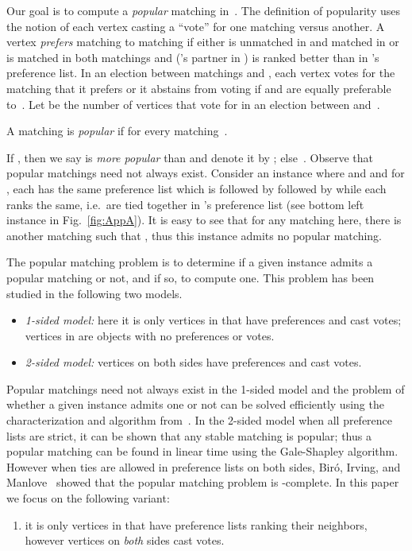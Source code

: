 \documentclass[11pt]{llncs}
\begin{document}
Our goal is to compute a {\em popular} matching in~. The definition of popularity uses the 
notion of each vertex casting a ``vote'' for one matching versus another. A vertex  
{\em prefers} matching  to matching  if either  is unmatched in  and matched in 
 or  is matched in both matchings and  ('s partner in ) is ranked better 
than  in 's preference list. In an election between matchings  and , each 
vertex  votes for the matching that it prefers or it abstains from voting if  and  
are equally preferable to~. Let  be the number of vertices that vote for  in 
an election between  and~.

\begin{definition}
A matching  is \emph{popular} if  for every matching~.
\end{definition}

If , then we say  is {\em more popular} than  and denote it by 
; else~. Observe that popular matchings need not always exist. 
Consider an instance where  and  and for , 
each  has the same preference list which is  followed by  followed by  
while each  ranks  the same, i.e.\  are tied together in 's 
preference list (see bottom left instance in Fig.~\ref{fig:AppA}). It is easy to see that for any matching  
here, there is another matching  such that , thus this instance admits no 
popular matching.

The popular matching problem is to determine if a given instance  admits a 
popular matching or not, and if so, to compute one. This problem has been studied in the 
following two models.
\begin{itemize}
\item {\em 1-sided model:} here it is only vertices in  that have preferences and cast 
votes; vertices in  are objects with no preferences or votes.
\item {\em 2-sided model:} vertices on both sides have preferences and cast votes.
\end{itemize}

Popular matchings need not always exist in the 1-sided model and the problem of whether a 
given instance admits one or not can be solved efficiently using the characterization and 
algorithm from~\cite{AIKM05}. In the 2-sided model when all preference lists are strict, it 
can be shown that any stable matching is popular; thus a popular matching can be 
found in linear time using the Gale-Shapley algorithm. However when ties are allowed in 
preference lists on both sides, Bir\'o, Irving, and Manlove~\cite{BIM09} showed that the 
popular matching problem is -complete. In this paper we focus on the following 
variant:
\begin{enumerate} []
\item it is only vertices in  that have preference lists ranking their neighbors, 
however vertices on {\em both} sides cast votes.
\end{enumerate}
\end{document}
